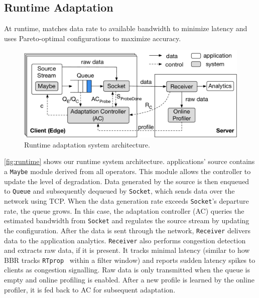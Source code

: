 \subsection{Runtime Adaptation}
\label{sec:runtime}

At runtime, \sysname{} matches data rate to available bandwidth to minimize
latency and uses Pareto-optimal configurations to maximize accuracy.

\begin{figure}
  \centering
  \includegraphics[width=\linewidth]{figures/runtime-adaptation.pdf}
  \caption{Runtime adaptation system architecture.}
  \label{fig:runtime}
\end{figure}

\autoref{fig:runtime} shows our runtime system architecture. \sysname{}
applications' source contains a \texttt{Maybe} module derived from all \maybe{}
operators. This module allows the controller to update the level of
degradation. Data generated by the source is then enqueued to \texttt{Queue} and
subsequently dequeued by \texttt{Socket}, which sends data over the network
using TCP. When the data generation rate exceeds \texttt{Socket}'s departure
rate, the queue grows. In this case, the adaptation controller (AC) queries the
estimated bandwidth from \texttt{Socket} and regulates the source stream by
updating the configuration. After the data is sent through the network,
\texttt{Receiver} delivers data to the application analytics. \texttt{Receiver}
also performs congestion detection and extracts raw data, if it is present.  It
tracks minimal latency (similar to how BBR tracks
\texttt{RTprop}~\cite{cardwell2017bbr} within a filter window) and reports
sudden latency spikes to clients as congestion signalling. Raw data is only
transmitted when the queue is empty and online profiling is enabled. After a new
profile is learned by the online profiler, it is fed back to AC for subsequent
adaptation.

